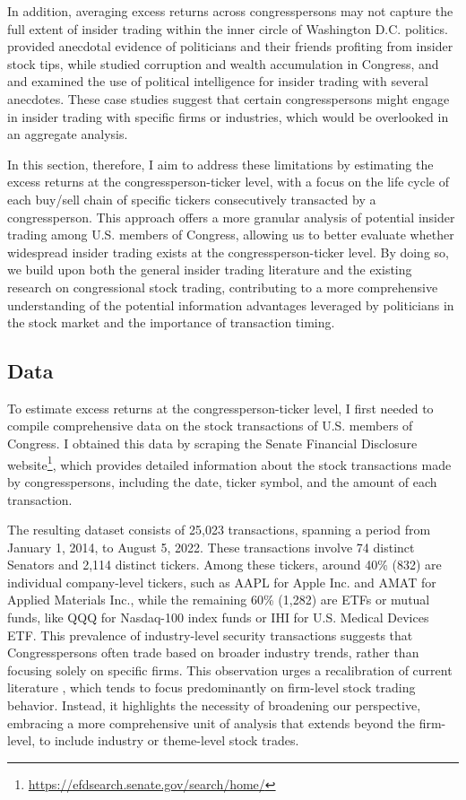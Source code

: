 \documentclass[15pt,letterpaper]{article}
\begin{document}
In addition, averaging excess returns across congresspersons may not capture the full extent of insider trading within the inner circle of Washington D.C. politics. \cite{schweizer2011} provided anecdotal evidence of politicians and their friends profiting from insider stock tips, 
while \cite{lim2009} studied corruption and wealth accumulation in Congress, and \cite{jerke2010} and \cite{bainbridge2010}
examined the use of political intelligence for insider trading with several anecdotes. 
These case studies suggest that certain congresspersons might engage in insider trading with specific firms or industries,
 which would be overlooked in an aggregate analysis.

In this section, therefore, I aim to address these limitations by estimating the excess returns at the congressperson-ticker level, with a focus on the life cycle of each buy/sell chain of specific tickers consecutively transacted by a congressperson. This approach offers a more granular analysis of potential insider trading among U.S. members of Congress, allowing us to better evaluate whether widespread insider trading exists at the congressperson-ticker level. By doing so, we build upon both the general insider trading literature and the existing research on congressional stock trading, contributing to a more comprehensive understanding of the potential information advantages leveraged by politicians in the stock market and the importance of transaction timing.

\subsection{Data}\label{sen-data}

To estimate excess returns at the congressperson-ticker level, I first needed to compile comprehensive data on the stock transactions of U.S. members of Congress. I obtained this data by scraping the Senate Financial Disclosure website\footnote{\url{https://efdsearch.senate.gov/search/home/}}, which provides detailed information about the stock transactions made by congresspersons, including the date, ticker symbol, and the amount of each transaction.

The resulting dataset consists of 25,023 transactions, spanning a period from January 1, 2014, to August 5, 2022. These transactions involve 74 distinct Senators and 2,114 distinct tickers. Among these tickers, around 40\% (832) are individual company-level tickers, such as AAPL for Apple Inc. and AMAT for Applied Materials Inc., while the remaining 60\% (1,282) are ETFs or mutual funds, like QQQ for Nasdaq-100 index funds or IHI for U.S. Medical Devices ETF.
This prevalence of industry-level security transactions suggests that Congresspersons often trade based on broader industry trends, rather than focusing solely on specific firms. This observation urges a recalibration of current literature \citep{zi11,zi24, eg13, eg14}, which tends to focus predominantly on firm-level stock trading behavior. Instead, it highlights the necessity of broadening our perspective, embracing a more comprehensive unit of analysis that extends beyond the firm-level, to include industry or theme-level stock trades.
\end{document}
